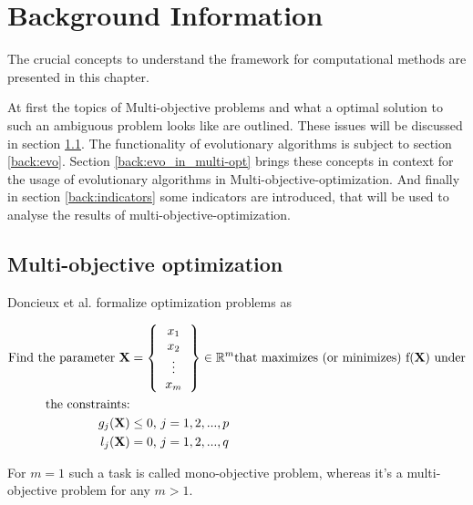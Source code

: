 \documentclass[12pt,twoside]{article}
\theoremstyle{plain}
\theoremstyle{definition}
\theoremstyle{remark}
\begin{document}
\section{Background Information}
\label{sec:background}
The crucial concepts to understand the framework for computational methods are presented in this chapter.

At first the topics of Multi-objective problems and what a optimal solution to such an ambiguous problem looks like are outlined. These issues will be discussed in section \ref{back:multi-opt}. 
The functionality of evolutionary algorithms is subject to section \ref{back:evo}.
Section \ref{back:evo_in_multi-opt} brings these concepts in context for the usage of evolutionary algorithms in Multi-objective-optimization.
And finally in section \ref{back:indicators} some indicators are introduced, that will be used to analyse the results of multi-objective-optimization.

\subsection{Multi-objective optimization}
\label{back:multi-opt}
Doncieux et al. \cite{doncieux2015multi} formalize optimization problems as

\begin{align*}
	\text{Find the parameter }\textbf{X} &=
	\left \{
	\begin{tabular}{c}
		$x_1$\\
		$x_2$\\
		\vdots\\
		$x_m$
	\end{tabular}
	\right \}
	\in \mathbb{R}^m \text{that maximizes (or minimizes) f(\textbf{X}) under}\\
		 \text{the constraints:}\\
	g_j(\textbf{X}) &\le 0 \text{,  } j = 1,2,... ,p\\
	l_j(\textbf{X}) &= 0 \text{,  } j = 1,2,... ,q
\end{align*}

For $m = 1$ such a task is called mono-objective problem, whereas it's a multi-objective problem for any $m > 1$.
\end{document}
